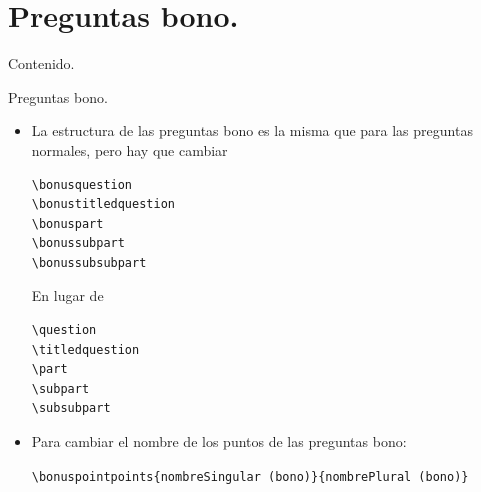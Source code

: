 \documentclass[dvipsnames,xcolor=x11names, handout]{beamer}
\theoremstyle{plain}
\theoremstyle{definition}
\begin{document}
\section{Preguntas bono.}
\begin{frame}{Contenido.}
  \tableofcontents[currentsection]
\end{frame}
\begin{frame}[fragile]{Preguntas bono.}
\begin{itemize}[<+->]
\item La estructura de las preguntas bono es la misma que para las preguntas normales, pero hay que cambiar 
\vfill
\begin{minipage}{0.35\linewidth}
\begin{verbatim}
\bonusquestion
\bonustitledquestion
\bonuspart
\bonussubpart
\bonussubsubpart
\end{verbatim}
\end{minipage}
\begin{minipage}{0.3\linewidth}
\begin{center}
En lugar de 
\end{center}
\end{minipage}
\begin{minipage}{0.25\linewidth}
\begin{verbatim}
\question
\titledquestion
\part
\subpart
\subsubpart
\end{verbatim}
\end{minipage}
\vfill
    \item Para cambiar el nombre de los puntos de las preguntas bono:
    \begin{scriptsize}
    \verb!\bonuspointpoints{nombreSingular (bono)}{nombrePlural (bono)}!
    \end{scriptsize}
\end{itemize}
    
\end{frame}
\end{document}
